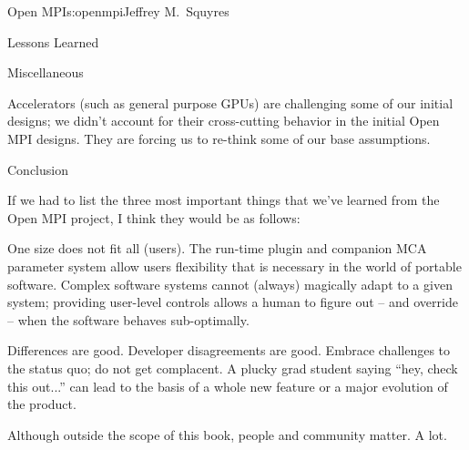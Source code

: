 \begin{aosachapter}{Open MPI}{s:openmpi}{Jeffrey M.\ Squyres}
\begin{aosasect1}{Lessons Learned}
\begin{aosasect2}{Miscellaneous}
\begin{aosaitemize}
\item Accelerators (such as general purpose GPUs) are challenging some
  of our initial designs; we didn't account for their cross-cutting
  behavior in the initial Open MPI designs.  They are forcing us to
  re-think some of our base assumptions.

\end{aosaitemize}

\end{aosasect2}


\begin{aosasect2}{Conclusion}

If we had to list the three most important things that we've learned
from the Open MPI project, I think they would be as follows:

\begin{aosaitemize}
\item One size does not fit all (users).  The run-time plugin and
  companion MCA parameter system allow users flexibility that is
  necessary in the world of portable software.  Complex software
  systems cannot (always) magically adapt to a given system; providing
  user-level controls allows a human to figure out -- and override --
  when the software behaves sub-optimally.

\item Differences are good.  Developer disagreements are good.
  Embrace challenges to the status quo; do not get complacent.  A
  plucky grad student saying ``hey, check this out...'' can lead to
  the basis of a whole new feature or a major evolution of the
  product.

\item Although outside the scope of this book, people and community
  matter.  A lot.
\end{aosaitemize}

\end{aosasect2}

\end{aosasect1}

\end{aosachapter}

